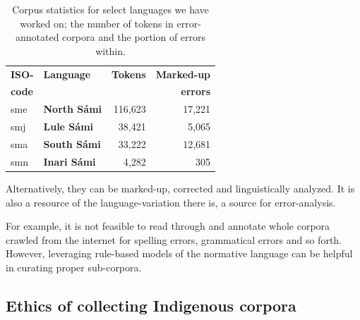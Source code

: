 \documentclass[free]{flammie}
\begin{document}
\begin{table}[!ht]
\begin{center}
\begin{tabularx}{\columnwidth}{Xlrr}

      \toprule
      \bf ISO- & \bf Language & \bf Tokens & \bf Marked-up \\
      \bf code & & & \bf errors \\
      \midrule
      sme & \bf North Sámi & 116,623 & 17,221 \\
      \midrule
      smj & \bf Lule Sámi & 38,421 & 5,065\\
      \midrule
     sma & \bf South Sámi & 33,222 & 12,681 \\
      \midrule
     smn & \bf Inari Sámi & 4,282 & 305 \\
      \bottomrule

\end{tabularx}
\caption{\label{table:annotated-corpora} Corpus statistics for select languages
    we have worked on; the number of tokens in error-annotated corpora and the
    portion of errors within.}
 \end{center}
\end{table}

Alternatively, they can be marked-up, corrected and linguistically analyzed. It
is also a resource of the language-variation there is, a source for
error-analysis.

For example, it is not feasible to read through and annotate whole corpora
crawled from the internet for spelling errors, grammatical errors and so forth.
However, leveraging rule-based models of the normative language can be helpful
in curating proper sub-corpora.

\subsection{Ethics of collecting Indigenous corpora}
\end{document}
